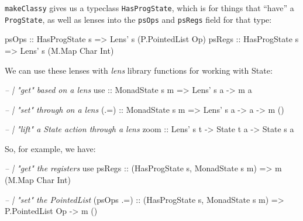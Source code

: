 \documentclass[]{article}
\newenvironment{Shaded}{}{}
\newcommand{\CommentTok}[1]{\textcolor[rgb]{0.38,0.63,0.69}{\textit{#1}}}
\newcommand{\DataTypeTok}[1]{\textcolor[rgb]{0.56,0.13,0.00}{#1}}
\newcommand{\FunctionTok}[1]{\textcolor[rgb]{0.02,0.16,0.49}{#1}}
\newcommand{\NormalTok}[1]{#1}
\newcommand{\OtherTok}[1]{\textcolor[rgb]{0.00,0.44,0.13}{#1}}
\begin{document}
\texttt{makeClassy} gives us a typeclass \texttt{HasProgState}, which is for
things that ``have'' a \texttt{ProgState}, as well as lenses into the
\texttt{psOps} and \texttt{psRegs} field for that type:

\begin{Shaded}
\begin{Highlighting}[]
\OtherTok{psOps  ::} \DataTypeTok{HasProgState}\NormalTok{ s }\OtherTok{=>} \DataTypeTok{Lens'}\NormalTok{ s (}\DataTypeTok{P.PointedList} \DataTypeTok{Op}\NormalTok{)}
\OtherTok{psRegs ::} \DataTypeTok{HasProgState}\NormalTok{ s }\OtherTok{=>} \DataTypeTok{Lens'}\NormalTok{ s (}\DataTypeTok{M.Map} \DataTypeTok{Char} \DataTypeTok{Int}\NormalTok{)}
\end{Highlighting}
\end{Shaded}

We can use these lenses with \emph{lens} library functions for working with
State:

\begin{Shaded}
\begin{Highlighting}[]
\CommentTok{-- | "get" based on a lens}
\OtherTok{use   ::} \DataTypeTok{MonadState}\NormalTok{ s m }\OtherTok{=>} \DataTypeTok{Lens'}\NormalTok{ s a }\OtherTok{->}\NormalTok{ m a}

\CommentTok{-- | "set" through on a lens}
\OtherTok{(.=)  ::} \DataTypeTok{MonadState}\NormalTok{ s m }\OtherTok{=>} \DataTypeTok{Lens'}\NormalTok{ s a }\OtherTok{->}\NormalTok{ a }\OtherTok{->}\NormalTok{ m ()}

\CommentTok{-- | "lift" a State action through a lens}
\OtherTok{zoom  ::} \DataTypeTok{Lens'}\NormalTok{ s t }\OtherTok{->} \DataTypeTok{State}\NormalTok{ t a }\OtherTok{->} \DataTypeTok{State}\NormalTok{ s a}
\end{Highlighting}
\end{Shaded}

So, for example, we have:

\begin{Shaded}
\begin{Highlighting}[]
\CommentTok{-- | "get" the registers}
\NormalTok{use}\OtherTok{ psRegs ::}\NormalTok{ (}\DataTypeTok{HasProgState}\NormalTok{ s, }\DataTypeTok{MonadState}\NormalTok{ s m) }\OtherTok{=>}\NormalTok{ m (}\DataTypeTok{M.Map} \DataTypeTok{Char} \DataTypeTok{Int}\NormalTok{)}

\CommentTok{-- | "set" the PointedList}
\NormalTok{(psOps }\FunctionTok{.=}\NormalTok{)}\OtherTok{ ::}\NormalTok{ (}\DataTypeTok{HasProgState}\NormalTok{ s, }\DataTypeTok{MonadState}\NormalTok{ s m) }\OtherTok{=>} \DataTypeTok{P.PointedList} \DataTypeTok{Op} \OtherTok{->}\NormalTok{ m ()}
\end{Highlighting}
\end{Shaded}
\end{document}
